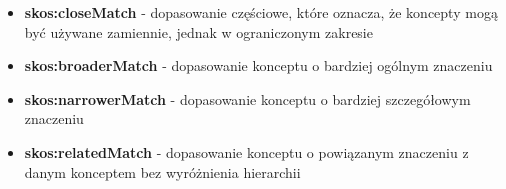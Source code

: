 \documentclass[12pt,a4paper,notitlepage]{article}
\begin{document}
\begin{itemize}
\begin{itemize}
        \item \textbf{skos:closeMatch} - dopasowanie częściowe, które oznacza,
          że koncepty mogą być używane zamiennie, jednak w ograniczonym
          zakresie
        \item \textbf{skos:broaderMatch} - dopasowanie konceptu o bardziej
          ogólnym znaczeniu
        \item \textbf{skos:narrowerMatch} - dopasowanie konceptu o bardziej
          szczegółowym znaczeniu
        \item \textbf{skos:relatedMatch} - dopasowanie konceptu o powiązanym
          znaczeniu z danym konceptem bez wyróżnienia hierarchii
      \end{itemize}
\end{itemize}
{}
\end{document}
